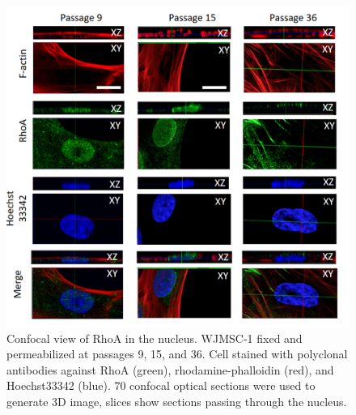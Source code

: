 \documentclass[alpha-refs]{wiley-article}
\begin{document}
\begin{figure}[hbt!]
  \includegraphics[width=0.9\linewidth]{rho-3d.png}
  \caption{Confocal view of RhoA in the nucleus. WJMSC-1 fixed and permeabilized at passages 9, 15, and 36. Cell stained with polyclonal antibodies against RhoA (green), rhodamine-phalloidin (red), and Hoechst33342 (blue). 70 confocal optical sections were used to generate 3D image, slices show sections passing through the nucleus.}
  \centering
\end{figure}
\end{document}

